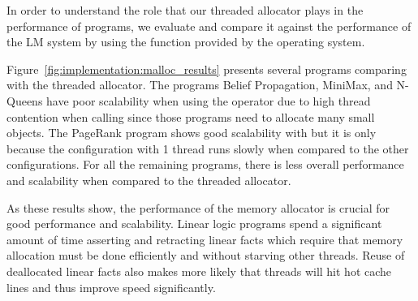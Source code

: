 In order to understand the role that our threaded allocator plays in the
performance of programs, we evaluate and compare it against the performance of
the LM system by using the  function provided by the operating
system.

Figure~\ref{fig:implementation:malloc_results} presents several programs
comparing  with the threaded allocator. The programs Belief
Propagation, MiniMax, and N-Queens have poor scalability when using the
 operator due to high thread contention when calling 
since those programs need to allocate many small objects. The PageRank program
shows good scalability with  but it is only because the
configuration with 1 thread runs slowly when compared to the other
configurations. For all the remaining programs, there is less overall
performance and scalability when compared to the threaded allocator.

As these results show, the performance of the memory allocator is crucial for
good performance and scalability. Linear logic programs spend a significant
amount of time asserting and retracting linear facts which require that memory
allocation must be done efficiently and without starving other threads. Reuse of
deallocated linear facts also makes more likely that threads will hit hot cache
lines and thus improve speed significantly.

\newcommand{\smallplotsize}[0]{0.3}


